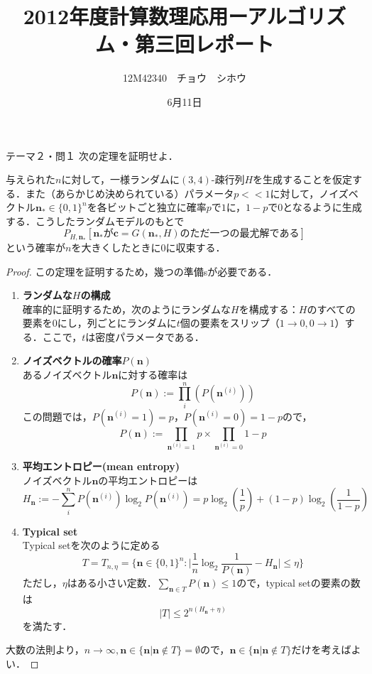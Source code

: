 \documentclass[a4paper,11pt]{jsarticle}
\title{2012年度計算数理応用ーアルゴリズム・第三回レポート}
\author{12M42340　チョウ　シホウ}
\date{6月11日}
\numberwithin{theorem}{section}  %
\numberwithin{equation}{section} %
\begin{document}
{}
\renewcommand{\thepart}{\arabic{part}}

\begin{itembox}[l]{テーマ２・問１}
次の定理を証明せよ．

与えられた$n$に対して，一様ランダムに$(3,4)$-疎行列$H$を生成することを仮定する．また（あらかじめ決められている）パラメータ$p<<1$に対して，ノイズベクトル$\bm{n}_*\in\{0,1\}^n$を各ビットごと独立に確率$p$で$1$に，$1-p$で$0$となるように生成する．こうしたランダムモデルのもとで
\[
P_{H,\bm{n}_*}[\bm{n}_*\text{が}\bm{c}=G(\bm{n}_*,H)\text{のただ一つの最尤解である}]
\]
という確率が$n$を大きくしたときに$0$に収束する．
\end{itembox}
\begin{proof}

この定理を証明するため，幾つの準備sが必要である．
\begin{enumerate}
\item {\bf ランダムな$H$の構成}\\
確率的に証明するため，次のようにランダムな$H$を構成する：$H$のすべての要素を$0$にし，列ごとにランダムに$t$個の要素をスリップ（$1 \to 0, 0\to 1$）する．ここで，$t$は密度パラメータである．
\item {\bf ノイズベクトルの確率$P(\bm{n})$}\\
あるノイズベクトル$\bm{n}$に対する確率は
\[
P(\bm{n}) := \prod_i^n (P(\bm{n}^{(i)}))
\]
この問題では，$P(\bm{n}^{(i)}=1)=p$，$P(\bm{n}^{(i)}=0)=1-p$ので，
\[
P(\bm{n}) := \prod_{\bm{n}^{(i)}=1} p \times \prod_{\bm{n}^{(i)}=0} 1-p
\]
\item {\bf 平均エントロピー(mean entropy)}\\
ノイズベクトル$\bm{n}$の平均エントロピーは
\[
H_{\bm{n}} := - \sum_{i}^n P(\bm{n}^{(i)}) \log_2 P(\bm{n}^{(i)}) = p\log_2(\frac{1}{p}) + (1-p)\log_2(\frac{1}{1-p})
\]
\item {\bf Typical set}\\
Typical setを次のように定める
\[
T = T_{n,\eta} = \Bigr\{ \bm{n} \in \{0,1\}^n : \Bigr|\frac{1}{n}\log_2\frac{1}{P(\bm{n})}-H_{\bm{n}}\Bigr| \le \eta \Bigr\}
\]
ただし，$\eta$はある小さい定数．$\sum_{\bm{n}\in T} P(\bm{n}) \le 1$ので，typical setの要素の数は
\[
|T| \le 2^{n(H_{\bm{n}}+\eta)}
\]
を満たす．
\end{enumerate}

大数の法則より，$n\to\infty,\bm{n}\in \{\bm{n}|\bm{n}\notin T \}=\emptyset$ので，$\bm{n}\in \{\bm{n}|\bm{n}\notin T \}$だけを考えばよい．


\end{proof}
\end{document}
